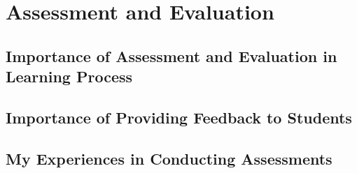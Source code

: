 \chapter{Assessment and Evaluation}
\section{Importance of Assessment and Evaluation in Learning Process}
\section{Importance of Providing Feedback to Students}
\section{My Experiences in Conducting Assessments}